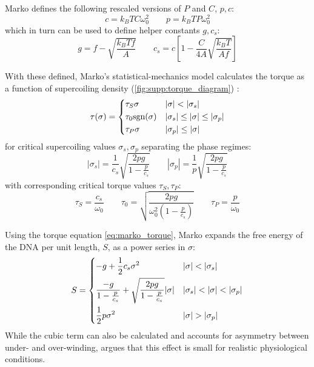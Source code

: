 \documentclass[11pt]{article}
\begin{document}
Marko defines the following rescaled versions of \(P\) and \(C\), \(p,c\):
\[c = k_B T C \omega_0^2 \qquad p = k_B T P \omega_0^2\]
which in turn can be used to define helper constants \(g, c_s\):
\[g = f - \sqrt{\frac{k_B T f}{A}} \qquad c_s = c \left[1 - \frac{C}{4A} \sqrt{\frac{k_B T}{A f}}\right]\]

With these defined, Marko's statistical-mechanics model calculates the torque as a function of supercoiling density (\cref{fig:supp:torque_diagram}) \parencite{markoTorqueDynamicsLinking2007}:
\begin{equation}
    \tau(\sigma) = \begin{dcases} \tau_S \sigma & |\sigma| < |\sigma_s| \\ \tau_0 \text{sgn}(\sigma) & |\sigma_s| \leq |\sigma | \leq |\sigma_p| \\ \tau_P \sigma & |\sigma_p| \leq |\sigma|\end{dcases}
    \label{eq:marko_torque}
\end{equation}
for critical supercoiling values \(\sigma_s, \sigma_p\) separating the phase regimes:
\begin{equation}
    |\sigma_s| = \frac{1}{c_s} \sqrt{\frac{2pg}{1 - \frac{p}{c_s}}} \qquad |\sigma_p| = \frac{1}{p} \sqrt{\frac{2pg}{1 - \frac{p}{c_s}}}
    \label{eq:critical_sigma_values}
\end{equation}
with corresponding critical torque values \(\tau_S, \tau_P\):
\begin{equation}
    \tau_S = \frac{c_s}{\omega_0} \qquad \tau_0 = \sqrt{\frac{2 pg}{\omega_0^2 \left(1 - \frac{p}{c_s}\right)}} \qquad \tau_P = \frac{p}{\omega_0}
    \label{eq:critical_tau_values}
\end{equation}

Using the torque equation \cref{eq:marko_torque}, Marko expands the free energy of the DNA per unit length, \(S\), as a power series in \(\sigma\):
\begin{equation}
    S = \begin{dcases}
        -g + \frac{1}{2} c_s \sigma^2 & |\sigma| < |\sigma_s| \\
        \frac{-g}{1 - \frac{p}{c_s}} + \sqrt{\frac{2 p g}{1 - \frac{p}{c_s}}} |\sigma| & |\sigma_s| < |\sigma| < |\sigma_p| \\
        \frac{1}{2} p \sigma^2 & |\sigma| > |\sigma_p|
    \end{dcases}
    \label{eq:marko_energy}
\end{equation}
While the cubic term can also be calculated and accounts for asymmetry between under- and over-winding,  \textcite{markoTorqueDynamicsLinking2007} argues that this effect is small for realistic physiological conditions.
\end{document}
